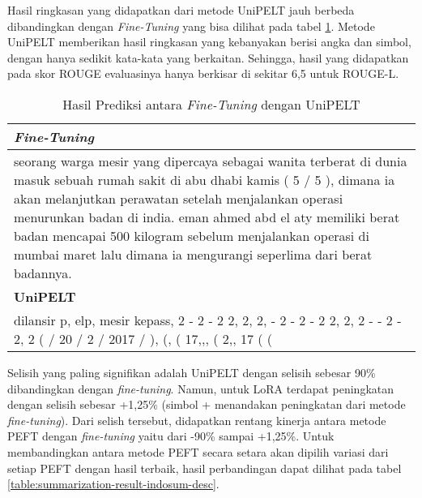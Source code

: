 Hasil ringkasan yang didapatkan dari metode UniPELT jauh berbeda dibandingkan dengan \textit{Fine-Tuning} yang bisa dilihat pada tabel \ref{table:predict-result-unipelt}. Metode UniPELT memberikan hasil ringkasan yang kebanyakan berisi angka dan simbol, dengan hanya sedikit kata-kata yang berkaitan. Sehingga, hasil yang didapatkan pada skor ROUGE evaluasinya hanya berkisar di sekitar 6,5 untuk ROUGE-L.

\begin{table}[h]
    \vspace{0.25cm}
    \caption{Hasil Prediksi antara \textit{Fine-Tuning} dengan UniPELT}
    \label{table:predict-result-unipelt}
    \begin{center}
        \begin{tabularx}{\textwidth}{X}
            \toprule
            \textbf{\textit{Fine-Tuning}} \\
            \midrule
            seorang warga mesir yang dipercaya sebagai wanita terberat di dunia masuk sebuah rumah sakit di abu dhabi kamis ( 5 / 5 ), dimana ia akan melanjutkan perawatan setelah menjalankan operasi menurunkan badan di india. eman ahmed abd el aty memiliki berat badan mencapai 500 kilogram sebelum menjalankan operasi di mumbai maret lalu dimana ia mengurangi seperlima dari berat badannya. \\
            \toprule
            \textbf{UniPELT} \\
            \midrule
            dilansir p, elp, mesir kepass, 2 - 2 - 2 2, 2, 2, - 2 - 2 - 2 2, 2, 2 - - 2 - 2, 2 ( / 20 / 2 / 2017 / ), (, ( 17,,, ( 2,, 17 ( ( \\
            \bottomrule
        \end{tabularx}
    \end{center}
\end{table}

Selisih yang paling signifikan adalah UniPELT dengan selisih sebesar 90\% dibandingkan dengan \textit{fine-tuning}. Namun, untuk LoRA terdapat peningkatan dengan selisih sebesar +1,25\% (simbol + menandakan peningkatan dari metode \textit{fine-tuning}). Dari selish tersebut, didapatkan rentang kinerja antara metode PEFT dengan \textit{fine-tuning} yaitu dari -90\% sampai +1,25\%. Untuk membandingkan antara metode PEFT secara setara akan dipilih variasi dari setiap PEFT dengan hasil terbaik, hasil perbandingan dapat dilihat pada tabel \ref{table:summarization-result-indosum-desc}.


